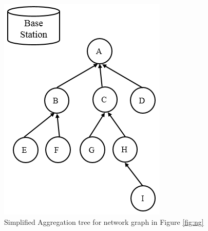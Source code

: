 	\begin{figure}[h!]
		\centering
		\includegraphics[scale = 1]{images/aggregation-tree.png}
		\caption{Simplified Aggregation tree for network graph in Figure \ref{fig:ng}}
		\label{fig:at}
	\end{figure}		

